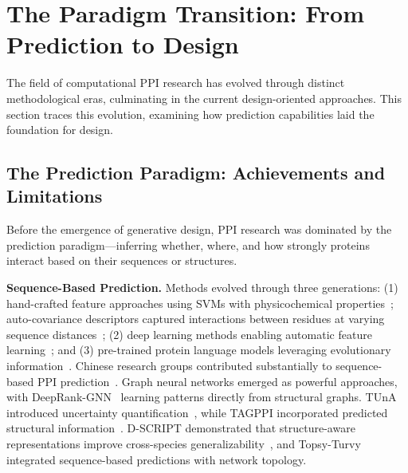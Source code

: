 \section{The Paradigm Transition: From Prediction to Design}
\label{sec:transition}

The field of computational PPI research has evolved through distinct methodological eras, culminating in the current design-oriented approaches. This section traces this evolution, examining how prediction capabilities laid the foundation for design.

\subsection{The Prediction Paradigm: Achievements and Limitations}

Before the emergence of generative design, PPI research was dominated by the prediction paradigm---inferring whether, where, and how strongly proteins interact based on their sequences or structures.

\textbf{Sequence-Based Prediction.} Methods evolved through three generations: (1) hand-crafted feature approaches using SVMs with physicochemical properties~\cite{bock2001predicting,shen2007predicting,benhur2005kernel}; auto-covariance descriptors captured interactions between residues at varying sequence distances~\cite{guo2008using,you2017pssm}; (2) deep learning methods enabling automatic feature learning~\cite{chen2017deepppi,hashemifar2018dppi,chen2019pipr}; and (3) pre-trained protein language models leveraging evolutionary information~\cite{rives2021esm1b,sledzieski2021dscript}. Chinese research groups contributed substantially to sequence-based PPI prediction~\cite{lv2021gnnppi,tang2021high}. Graph neural networks emerged as powerful approaches, with DeepRank-GNN~\cite{bryant2022deeprank} learning patterns directly from structural graphs. TUnA introduced uncertainty quantification~\cite{gehring2024tuna}, while TAGPPI incorporated predicted structural information~\cite{xie2022tagppi}. D-SCRIPT demonstrated that structure-aware representations improve cross-species generalizability~\cite{sledzieski2021dscript}, and Topsy-Turvy~\cite{singh2022topsyturvy} integrated sequence-based predictions with network topology.

